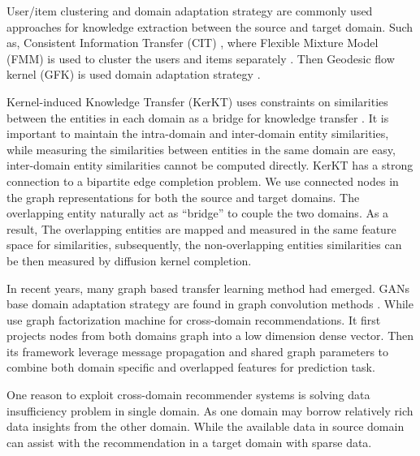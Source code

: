 User/item clustering and domain adaptation strategy are commonly used approaches for knowledge extraction between the source and target domain. Such as, Consistent Information Transfer (CIT) \citep{zhang2017cross}, where Flexible Mixture Model (FMM) is used to cluster the users and items separately \citep{si2003flexible}. Then Geodesic flow kernel (GFK) is used domain adaptation strategy \citep{gong2014learning}.

Kernel-induced Knowledge Transfer (KerKT) uses constraints on similarities between the entities in each domain as a bridge for knowledge transfer \citep{zhang2018cross}. It is important to maintain the intra-domain and inter-domain entity similarities, while measuring the similarities between entities in the same domain are easy, inter-domain entity similarities cannot be computed directly.
KerKT has a strong connection to a bipartite edge completion problem\citep{he2016birank}. We use connected nodes in the graph representations for both the source and target domains. The overlapping entity naturally act as “bridge” to couple the two domains.
As a result, The overlapping entities are mapped and measured in the same feature space for similarities, subsequently, the non-overlapping entities similarities can be then measured by diffusion kernel completion.

In recent years, many graph based transfer learning method had emerged. GANs \citep{goodfellow2014generative} base domain adaptation strategy are found in graph convolution methods \citep{dai2019network}. While \citet{xi2020graph} use graph factorization machine for cross-domain recommendations. It first projects nodes from both domains graph into a low dimension dense vector. Then its framework leverage message propagation and shared graph parameters to combine both domain specific and overlapped features for prediction task.

One reason to exploit cross-domain recommender systems is solving data insufficiency problem in single domain. As one domain may borrow relatively rich data insights from the other domain. While the available data in source domain can assist with the recommendation in a target domain with sparse data. 


